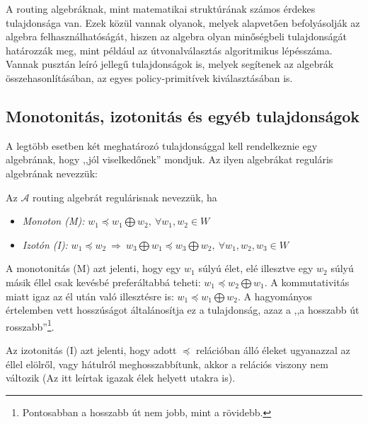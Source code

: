   A routing algebráknak, mint matematikai struktúrának számos érdekes tulajdonsága van. Ezek közül vannak olyanok, melyek alapvetően befolyásolják az algebra felhasználhatóságát, hiszen az algebra olyan minőségbeli tulajdonságát határozzák meg, mint például az útvonalválasztás algoritmikus lépésszáma. Vannak pusztán leíró jellegű tulajdonságok is, melyek segítenek az algebrák összehasonlításában, az egyes policy-primitívek kiválasztásában is.

    \subsection{Monotonitás, izotonitás és egyéb tulajdonságok}

    A legtöbb esetben két meghatározó tulajdonsággal kell rendelkeznie egy algebrának, hogy ,,jól viselkedőnek'' mondjuk. Az ilyen algebrákat reguláris algebrának nevezzük:

    \begin{definition} 
      Az $\mathcal{A}$ routing algebrát regulárisnak nevezzük, ha
      \begin{itemize}
      \item \emph{ Monoton (M):} $w_{1} \preceq w_{1} \bigoplus w_{2}, ~\forall w_{1}, w_{2} \in W$
      \item \emph{ Izotón (I):} $w_{1} \preceq w_{2}~\Rightarrow~w_{3} \bigoplus w_{1} \preceq w_{3} \bigoplus w_{2},~\forall w_{1}, w_{2}, w_{3} \in W$
      \end{itemize}
    \end{definition}

    A monotonitás (M) azt jelenti, hogy egy $w_1$ súlyú élet, elé illesztve egy $w_2$ súlyú másik éllel csak kevésbé preferáltabbá teheti: $w_{1} \preceq w_{2} \bigoplus w_{1}$. A kommutativitás miatt igaz az él után való illesztésre is: $w_{1} \preceq w_{1} \bigoplus w_{2}$. A hagyományos értelemben vett hosszúságot általánosítja ez a tulajdonság, azaz a ,,a hosszabb út rosszabb''\footnote{Pontosabban a hosszabb út nem jobb, mint a rövidebb.}.

    Az izotonitás (I) azt jelenti, hogy adott $\preceq$ relációban álló éleket ugyanazzal az éllel elölről, vagy hátulról meghosszabbítunk, akkor a relációs viszony nem változik (Az itt leírtak igazak élek helyett utakra is).\\

